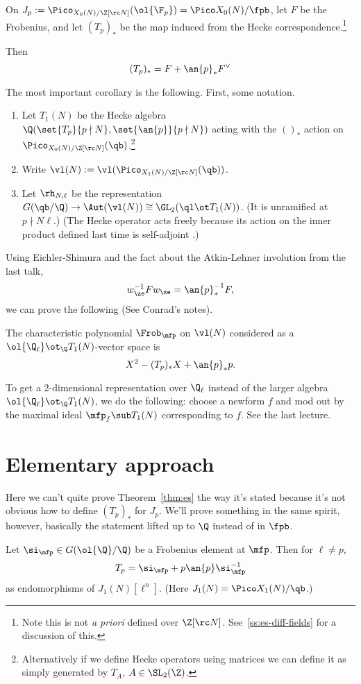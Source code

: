 \begin{thm}\label{thm:es}
On $J_p:=\Pico_{X_0(N)/\Z[\rc N]} (\ol{\F_p})=\Pico X_0(N)/\fpb$, let $F$ be the Frobenius, and let $(T_p)_*$ be the map induced from the Hecke correspondence.\footnote{Note this is not {\it a priori} defined over $\Z[\rc N]$. See~\ref{ss:es-diff-fields} for a discussion of this.}

Then
\[
(T_p)_*=F+\an{p}_*F^{\vee}
\]
\end{thm}
The most important corollary is the following. First, some notation.
\begin{enumerate}
\item
Let $T_1(N)$ be the Hecke algebra $\Q(\set{T_p}{p\nmid N},\set{\an{p}}{p\nmid N})$ acting with the $()_*$ action on $\Pico_{X_0(N)/\Z[\rc N]}(\qb)$.\footnote{Alternatively if we define Hecke operators using matrices we can define it as simply generated by $T_A$, $A\in \SL_2(\Z)$.}
\item Write $\vl(N):=\vl(\Pico_{X_1(N)/\Z[\rc N]}(\qb))$.
\item Let $\rh_{N,\ell}$ be the representation $G(\qb/\Q)\to \Aut(\vl(N))\cong \GL_2(\ql\ot T_1(N))$. (It is unramified at $p\nmid N\ell$.) (The Hecke operator acts freely because its action on the inner product defined last time is self-adjoint .)
\end{enumerate}
Using Eichler-Shimura and the fact about the Atkin-Lehner involution from the last talk,
\[
w_{\ze}^{-1}Fw_{\ze}=\an{p}_*^{-1}F,
\]
we can prove the following (See Conrad's notes).
\begin{thm}
The characteristic polynomial $\Frob_\mfp$ on $\vl(N)$ considered as a $\ol{\Q_{\ell}}\ot_{\Q} T_1(N)$-vector space is
\[
X^2-(T_p)_*X+\an{p}_*p.
\]
\end{thm}
To get a 2-dimensional representation over $\Q_{\ell}$ instead of the larger algebra $\ol{\Q_{\ell}}\ot_{\Q} T_1(N)$, we do the following: choose a newform $f$ and  mod out by the maximal ideal $\mfp_f\sub T_1(N)$ corresponding to $f$. See the last lecture.
\section{Elementary approach}
Here we can't quite prove Theorem~\ref{thm:es} the way it's stated because it's not obvious how to define $(T_p)_*$ for $J_p$. We'll prove something in the same spirit, however, basically the statement lifted up to $\Q$ instead of in $\fpb$.
\begin{thm}
Let $\si_\mfp\in G(\ol{\Q}/\Q)$ be a Frobenius element at $\mfp$. Then for $\ell\ne p$,
\[
T_p=\si_\mfp+p\an{p}\si_\mfp^{-1}
\]
as endomorphisms of $J_1(N)[\ell^n]$. (Here $J_1(N)=\Pico X_1(N)/\qb$.)
\end{thm}

